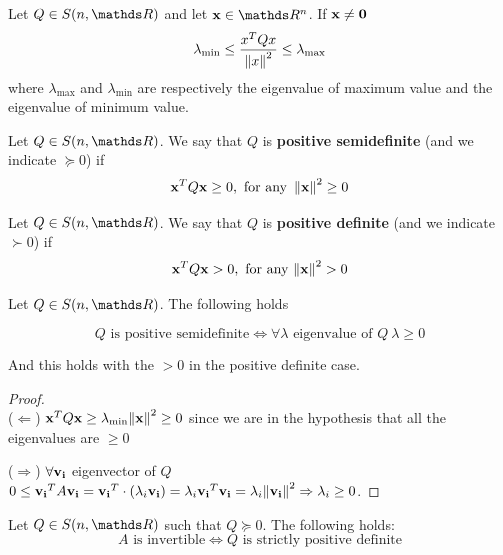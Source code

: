 \documentclass[computationalMathematics.tex]{subfiles}
\begin{document}
\begin{corollary}
  Let $Q \in S(n, \R)$ and let $\vect{x} \in \R^n$. If ${\bf x } \neq {\bf 0 }$
  \[
  		\lambda_{\text{min}} \le \frac{{x}^{T}Qx}{{\left\lVert x\right\rVert}^2} \le \lambda_{\text{max}}
  \]
  where $\lambda_{\text{max}}$ and $\lambda_{\text{min}}$ are respectively the eigenvalue of maximum value and the eigenvalue of minimum value.
\end{corollary}

\begin{definition}
  Let $Q \in S(n, \R)$. We say that $Q$ is \textbf{positive semidefinite} (and we indicate $\succeq 0$) if 
  \[
    {{\bf x }}^{T} Q {\bf x } \ge 0, \text{ for any } \left\lVert{\bf x }\right\rVert^2 \geq 0
  \]
\end{definition}

\begin{definition}
   Let $Q \in S(n, \R)$. We say that $Q$ is \textbf{positive definite} (and we indicate $\succ 0$) if 
  \[
    {{\bf x }}^{T} Q {\bf x } > 0, \text{ for any } {\left\lVert{\bf x }\right\rVert}^2 > 0
  \]
\end{definition}

\begin{proposition}
  Let $Q \in S(n, \R)$. The following holds
  
  \[
    Q \text{ is positive semidefinite} \iff \forall \lambda \text{ eigenvalue of } Q ~ \lambda \ge 0
  \]

  And this holds with the $>0$ in the positive definite case.
\end{proposition}

\begin{proof}~\\

  \hangindent=0.7cm ($\Leftarrow$) ${{\bf x }}^{T} Q {\bf x } \ge \lambda_{\text{min}} {\left\lVert{\bf x }\right\rVert}^2 \geq 0$ since we are in the hypothesis that all the eigenvalues are $\geq 0$

  \hangindent=0.7cm ($\Rightarrow$) $ \forall {\bf v_i }$ eigenvector of $Q$ $0 \le {{\bf v_i }}^{T} A {\bf v_i } = {{\bf v_i }}^{T} \cdot ( \lambda_i {\bf v_i }) = \lambda_i  {{\bf v_i }}^{T} {\bf v_i } = \lambda_i {\left\lVert{\bf v_i }\right\rVert}^2 \Rightarrow \lambda_i \ge 0$.
\end{proof}

\begin{corollary}
  Let $Q \in S(n, \R)$ such that $Q \succeq 0$. The following holds:
  \[
    A \text{ is invertible} \iff Q \text{ is strictly positive definite}
  \]
\end{corollary}
\end{document}
